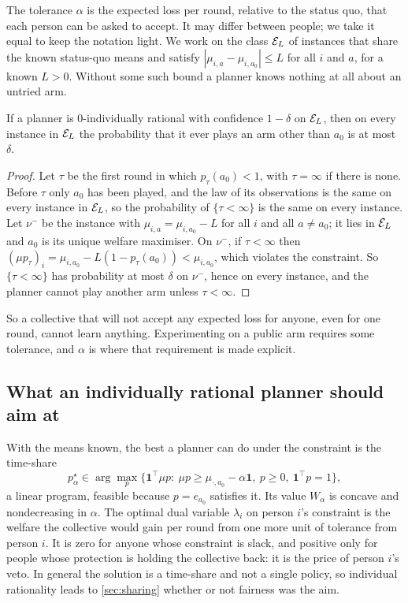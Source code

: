 The tolerance $\alpha$ is the expected loss per round, relative to the status quo, that each person can be asked to accept. It may differ between people; we take it equal to keep the notation light. We work on the class $\mathcal{E}_L$ of instances that share the known status-quo means and satisfy $|\mu_{i,a}-\mu_{i,a_0}|\le L$ for all $i$ and $a$, for a known $L>0$. Without some such bound a planner knows nothing at all about an untried arm.

\begin{proposition}\label{prop:nofree}
If a planner is $0$-individually rational with confidence $1-\delta$ on $\mathcal{E}_L$, then on every instance in $\mathcal{E}_L$ the probability that it ever plays an arm other than $a_0$ is at most $\delta$.
\end{proposition}

\begin{proof}
Let $\tau$ be the first round in which $p_\tau(a_0)<1$, with $\tau=\infty$ if there is none. Before $\tau$ only $a_0$ has been played, and the law of its observations is the same on every instance in $\mathcal{E}_L$, so the probability of $\{\tau<\infty\}$ is the same on every instance. Let $\nu^-$ be the instance with $\mu_{i,a}=\mu_{i,a_0}-L$ for all $i$ and all $a\neq a_0$; it lies in $\mathcal{E}_L$ and $a_0$ is its unique welfare maximiser. On $\nu^-$, if $\tau<\infty$ then $(\mu p_\tau)_i=\mu_{i,a_0}-L(1-p_\tau(a_0))<\mu_{i,a_0}$, which violates the constraint. So $\{\tau<\infty\}$ has probability at most $\delta$ on $\nu^-$, hence on every instance, and the planner cannot play another arm unless $\tau<\infty$.
\end{proof}

So a collective that will not accept any expected loss for anyone, even for one round, cannot learn anything. Experimenting on a public arm requires some tolerance, and $\alpha$ is where that requirement is made explicit.

\subsection{What an individually rational planner should aim at}

With the means known, the best a planner can do under the constraint is the time-share
\[
  p^\star_\alpha\in\arg\max_p\Big\{\mathbf 1^\top\mu p:\ \mu p\ge\mu_{\cdot,a_0}-\alpha\mathbf 1,\ p\ge0,\ \mathbf 1^\top p=1\Big\},
\]
a linear program, feasible because $p=e_{a_0}$ satisfies it. Its value $W_\alpha$ is concave and nondecreasing in $\alpha$. The optimal dual variable $\lambda_i$ on person $i$'s constraint is the welfare the collective would gain per round from one more unit of tolerance from person $i$. It is zero for anyone whose constraint is slack, and positive only for people whose protection is holding the collective back: it is the price of person $i$'s veto. In general the solution is a time-share and not a single policy, so individual rationality leads to \cref{sec:sharing} whether or not fairness was the aim.

